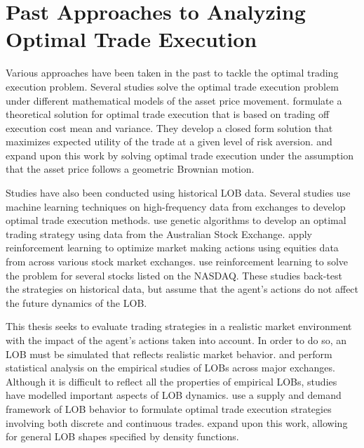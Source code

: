 \section{Past Approaches to Analyzing Optimal Trade Execution}
Various approaches have been taken in the past to tackle the optimal trading execution problem. Several studies solve the optimal trade execution problem under different mathematical models of the asset price movement. \cite{A1} formulate a theoretical solution for optimal trade execution that is based on trading off execution cost mean and variance. They develop a closed form solution that maximizes expected utility of the trade at a given level of risk aversion. \cite{A1a} and \cite{A1b} expand upon this work by solving optimal trade execution under the assumption that the asset price follows a geometric Brownian motion. 

Studies have also been conducted using historical LOB data. Several studies use machine learning techniques on high-frequency data from exchanges to develop optimal trade execution methods. \cite{A5} use genetic algorithms to develop an optimal trading strategy using data from the Australian Stock Exchange. \cite{A4} apply reinforcement learning to optimize market making actions using equities data from across various stock market exchanges. \cite{A3} use reinforcement learning to solve the problem for several stocks listed on the NASDAQ. These studies back-test the strategies on historical data, but assume that the agent's actions do not affect the future dynamics of the LOB.

This thesis seeks to evaluate trading strategies in a realistic market environment with the impact of the agent's actions taken into account. In order to do so, an LOB must be simulated that reflects realistic market behavior. \cite{A10a} and \cite{A10b} perform statistical analysis on the empirical studies of LOBs across major exchanges. Although it is difficult to reflect all the properties of empirical LOBs, studies have modelled important aspects of LOB dynamics. \cite{A11} use a supply and demand framework of LOB behavior to formulate optimal trade execution strategies involving both discrete and continuous trades. \cite{A2} expand upon this work, allowing for general LOB shapes specified by density functions.

